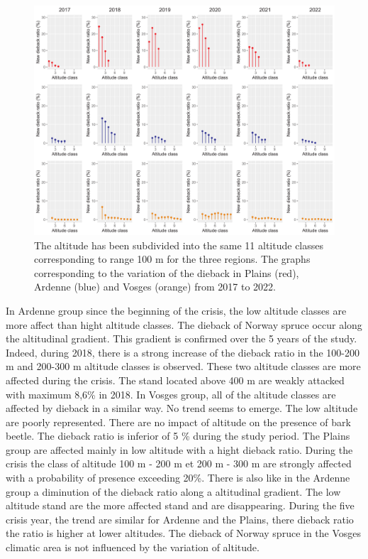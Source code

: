 \documentclass[3p,procedia]{elsarticle}
\begin{document}
\begin{figure}[htbp] 
\centering
	\includegraphics[width=\textwidth]{synthese_color_11_2022.png}
     \caption{The altitude has been subdivided into the same 11 altitude classes corresponding to range 100 m for the three regions. 
The graphs corresponding to the variation of the dieback in Plains (red), Ardenne (blue) and Vosges (orange) from 2017 to 2022.
}
	\label{alti_sco}
\end{figure}

In Ardenne group since the beginning of the crisis, the low altitude classes are more affect than hight altitude classes.
The dieback of Norway spruce occur along the altitudinal gradient.
This gradient is confirmed over the 5 years of the study.
Indeed, during 2018, there is a strong increase of the dieback ratio in the 100-200 m and 200-300 m altitude classes is observed. 
These two altitude classes are more affected during the crisis.
The stand located above 400 m are weakly attacked with maximum 8,6\% in 2018.
In Vosges group, all of the altitude classes are affected by dieback in a similar way.
No trend seems to emerge.
The low altitude are poorly represented. 
There are no impact of altitude on the presence of bark beetle. 
The dieback ratio is inferior of 5 \% during the study period.
The Plains group are affected mainly in low altitude with a hight dieback ratio. 
During the crisis the class of altitude 100 m - 200 m et 200 m - 300 m are strongly affected with a probability of presence exceeding 20\%.
There is also like in the Ardenne group a diminution of the dieback ratio along a altitudinal gradient.
The low altitude stand are the more affected stand and are disappearing.
During the five crisis year, the trend are similar for Ardenne and the Plains, there dieback ratio the ratio is higher at lower altitudes. 
The dieback of Norway spruce in the Vosges climatic area is not influenced by the variation of altitude.
\end{document}
